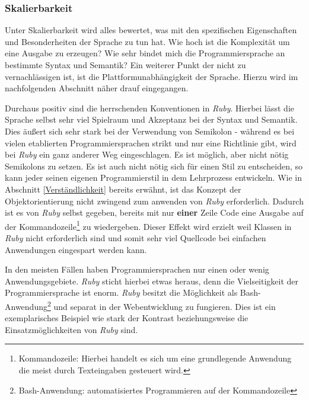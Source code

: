 \documentclass[12pt,DIV=14, version=first, BCOR=10mm,a4paper,twoside,parskip=half-,headsepline,headinclude]{scrartcl}
\begin{document}
\subsubsection{Skalierbarkeit}
\begin{flushleft}
Unter Skalierbarkeit wird alles bewertet, was mit den spezifischen Eigenschaften und Besonderheiten der Sprache zu tun hat. Wie hoch ist die Komplexität um eine Ausgabe zu erzeugen? Wie sehr bindet mich die Programmiersprache an bestimmte Syntax und Semantik? Ein weiterer Punkt der nicht zu vernachlässigen ist, ist die Plattformunabhängigkeit der Sprache. Hierzu wird im nachfolgenden Abschnitt näher drauf eingegangen.

Durchaus positiv sind die herrschenden Konventionen in \textit{\glqq Ruby\grqq}. Hierbei lässt die Sprache selbst sehr viel Spielraum und Akzeptanz bei der Syntax und Semantik. Dies äußert sich sehr stark bei der Verwendung von Semikolon - während es bei vielen etablierten Programmiersprachen strikt und nur eine Richtlinie gibt, wird bei \textit{\glqq Ruby\grqq} ein ganz anderer Weg eingeschlagen. Es ist möglich, aber nicht nötig Semikolons zu setzen. Es ist auch nicht nötig sich für einen Stil zu entscheiden, so kann jeder seinen eigenen Programmierstil in dem Lehrprozess entwickeln. Wie in Abschnitt \ref{Verständlichkeit} bereits erwähnt, ist das Konzept der Objektorientierung nicht zwingend zum anwenden von \textit{\glqq Ruby\grqq} erforderlich. Dadurch ist es von \textit{\glqq Ruby\grqq} selbst gegeben, bereits mit nur \textbf{einer} Zeile Code eine Ausgabe auf der Kommandozeile\footnote{\label{foot:2} {Kommandozeile: Hierbei handelt es sich um eine grundlegende Anwendung die meist durch Texteingaben gesteuert wird.}} zu wiedergeben. Dieser Effekt wird erzielt weil Klassen in \textit{\glqq Ruby\grqq} nicht erforderlich sind und somit sehr viel Quellcode bei einfachen Anwendungen eingespart werden kann.

In den meisten Fällen haben Programmiersprachen nur einen oder wenig Anwendungsgebiete. \textit{\glqq Ruby\grqq} sticht hierbei etwas heraus, denn die Vielseitigkeit der Programmiersprache ist enorm. \textit{\glqq Ruby\grqq} besitzt die Möglichkeit als Bash-Anwendung\footnote{\label{foot:3} {Bash-Anwendung: automatisiertes Programmieren auf der Kommandozeile}} und separat in der Webentwicklung zu fungieren. Dies ist ein exemplarisches Beispiel wie stark der Kontrast beziehungsweise die Einsatzmöglichkeiten von \textit{\glqq Ruby\grqq} sind.


\end{flushleft}
\end{document}
